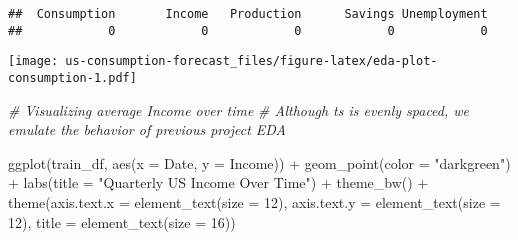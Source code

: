 \documentclass[
  12pt,
]{article}
\newenvironment{Shaded}{\begin{snugshade}}{\end{snugshade}}
\newcommand{\AttributeTok}[1]{\textcolor[rgb]{0.77,0.63,0.00}{#1}}
\newcommand{\CommentTok}[1]{\textcolor[rgb]{0.56,0.35,0.01}{\textit{#1}}}
\newcommand{\DecValTok}[1]{\textcolor[rgb]{0.00,0.00,0.81}{#1}}
\newcommand{\FunctionTok}[1]{\textcolor[rgb]{0.00,0.00,0.00}{#1}}
\newcommand{\NormalTok}[1]{#1}
\newcommand{\OtherTok}[1]{\textcolor[rgb]{0.56,0.35,0.01}{#1}}
\newcommand{\SpecialCharTok}[1]{\textcolor[rgb]{0.00,0.00,0.00}{#1}}
\newcommand{\StringTok}[1]{\textcolor[rgb]{0.31,0.60,0.02}{#1}}
\begin{document}
\begin{verbatim}
##  Consumption       Income   Production      Savings Unemployment 
##            0            0            0            0            0
\end{verbatim}

\begin{Shaded}
\end{Shaded}

\texttt{[image: us-consumption-forecast\_files/figure-latex/eda-plot-consumption-1.pdf]}

\begin{Shaded}
\begin{Highlighting}[]
\CommentTok{\# Visualizing average Income over time}
\CommentTok{\# Although ts is evenly spaced, we emulate the behavior of previous project EDA}

\FunctionTok{ggplot}\NormalTok{(train\_df, }\FunctionTok{aes}\NormalTok{(}\AttributeTok{x =}\NormalTok{ Date, }\AttributeTok{y =}\NormalTok{ Income)) }\SpecialCharTok{+}
  \FunctionTok{geom\_point}\NormalTok{(}\AttributeTok{color =} \StringTok{"darkgreen"}\NormalTok{) }\SpecialCharTok{+}
  \FunctionTok{labs}\NormalTok{(}\AttributeTok{title =} \StringTok{"Quarterly US Income Over Time"}\NormalTok{) }\SpecialCharTok{+}
  \FunctionTok{theme\_bw}\NormalTok{() }\SpecialCharTok{+}
  \FunctionTok{theme}\NormalTok{(}\AttributeTok{axis.text.x =} \FunctionTok{element\_text}\NormalTok{(}\AttributeTok{size =} \DecValTok{12}\NormalTok{),}
        \AttributeTok{axis.text.y =} \FunctionTok{element\_text}\NormalTok{(}\AttributeTok{size =} \DecValTok{12}\NormalTok{),}
        \AttributeTok{title =} \FunctionTok{element\_text}\NormalTok{(}\AttributeTok{size =} \DecValTok{16}\NormalTok{))}
\end{Highlighting}
\end{Shaded}
\end{document}
